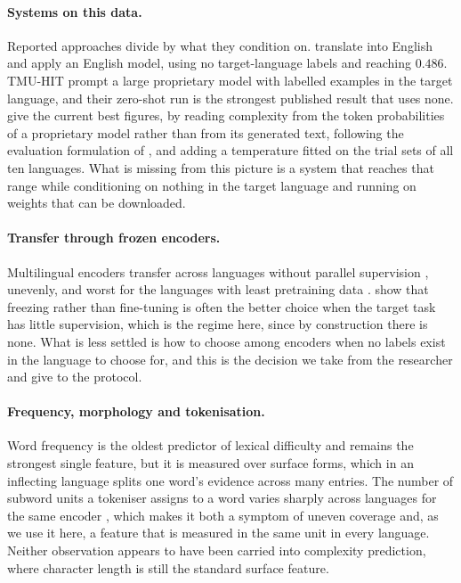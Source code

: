 \paragraph{Systems on this data.} Reported approaches divide by what they
condition on. \citet{cristea-nisioi-2024-machine} translate into English
and apply an English model, using no target-language labels and reaching
$0.486$. TMU-HIT \citep{enomoto-etal-2024-tmu} prompt a large
proprietary model with labelled examples in the target language, and
their zero-shot run is the strongest published result that uses none.
\citet{nohejl-etal-2025-japanese} give the current best figures, by
reading complexity from the token probabilities of a proprietary model
rather than from its generated text, following the evaluation
formulation of \citet{liu-etal-2023-geval}, and adding a temperature
fitted on the trial sets of all ten languages. What is missing from this
picture is a system that reaches that range while conditioning on
nothing in the target language and running on weights that can be
downloaded.

\paragraph{Transfer through frozen encoders.} Multilingual encoders
transfer across languages without parallel supervision
\citep{pires-etal-2019-multilingual, conneau2020xlmr}, unevenly, and
worst for the languages with least pretraining data
\citep{wu-dredze-2020-languages}. \citet{peters-etal-2019-tune} show
that freezing rather than fine-tuning is often the better choice when
the target task has little supervision, which is the regime here, since
by construction there is none. What is less settled is how to choose
among encoders when no labels exist in the language to choose for, and
this is the decision we take from the researcher and give to the
protocol.

\paragraph{Frequency, morphology and tokenisation.} Word frequency is
the oldest predictor of lexical difficulty and remains the strongest
single feature, but it is measured over surface forms, which in an
inflecting language splits one word's evidence across many entries. The
number of subword units a tokeniser assigns to a word varies sharply
across languages for the same encoder \citep{rust-etal-2021-good}, which
makes it both a symptom of uneven coverage and, as we use it here, a
feature that is measured in the same unit in every language. Neither
observation appears to have been carried into complexity prediction,
where character length is still the standard surface feature.


